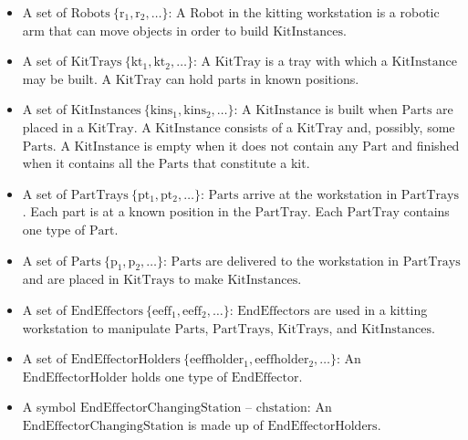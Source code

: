 \begin{small}
\begin{itemize}
\item A set of $\mathrm{Robots\ \lbrace r_1, r_2,\dots \rbrace}$: A $\mathrm{Robot}$ in the kitting workstation is a robotic arm that can move objects in order to build $\mathrm{KitInstances}$.

\item A set of $\mathrm{KitTrays\ \lbrace kt_1, kt_2,\dots \rbrace}$: A $\mathrm{KitTray}$ is a tray with which a $\mathrm{KitInstance}$ may be built. A $\mathrm{KitTray}$ can hold parts in known positions.
    
\item A set of $\mathrm{KitInstances\ \lbrace kins_1, kins_2,\dots \rbrace}$: A $\mathrm{KitInstance}$ is built when $\mathrm{Parts}$ are placed in a $\mathrm{KitTray}$. A $\mathrm{KitInstance}$ consists of a $\mathrm{KitTray}$ and, possibly, some $\mathrm{Parts}$. A $\mathrm{KitInstance}$ is empty when it does not contain any $\mathrm{Part}$ and finished when it contains all the $\mathrm{Parts}$ that constitute a kit.

\item A set of $\mathrm{PartTrays\ \lbrace pt_1, pt_2,\dots \rbrace}$: $\mathrm{Parts}$ arrive at the workstation in $\mathrm{PartTrays}$. Each part is at a known position in the $\mathrm{PartTray}$. Each $\mathrm{PartTray}$ contains one type of $\mathrm{Part}$.

\item A set of $\mathrm{Parts\ \lbrace p_1, p_2,\dots \rbrace}$: $\mathrm{Parts}$ are delivered to the workstation in $\mathrm{PartTrays}$ and are placed in $\mathrm{KitTrays}$ to make $\mathrm{KitInstances}$.
    
\item A set of $\mathrm{EndEffectors\ \lbrace eeff_1, eeff_2,\dots \rbrace}$: $\mathrm{EndEffectors}$ are used in a kitting workstation to manipulate $\mathrm{Parts}$, $\mathrm{PartTrays}$, $\mathrm{KitTrays}$, and $\mathrm{KitInstances}$.

\item A set of $\mathrm{EndEffectorHolders\ \lbrace eeffholder_1, eeffholder_2,\dots \rbrace}$: An $\mathrm{EndEffectorHolder}$ holds one type of $\mathrm{EndEffector}$.

\item A symbol $\mathrm{EndEffectorChangingStation}$ -- $\mathrm{chstation}$: An $\mathrm{EndEffectorChangingStation}$ is made up of $\mathrm{EndEffectorHolders}$.


\end{itemize}
\end{small}
